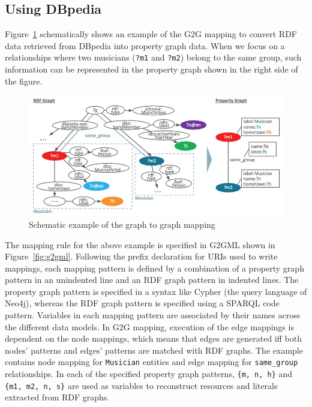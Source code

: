 \documentclass[runningheads]{llncs}
\begin{document}
 
\subsection{Using DBpedia}
 
Figure~\ref{fig:conversion} schematically shows an example of the G2G mapping to convert RDF data retrieved from DBpedia into property graph data. 
When we focus on a relationships where two musicians (\texttt{?m1} and \texttt{?m2}) belong to the same group, such information can be represented in the property graph shown in the right side of the figure.
 
\begin{figure}
\center
\includegraphics[width=1.0\textwidth]{example.jpg}
\caption{Schematic example of the graph to graph mapping}
\label{fig:conversion}
\end{figure}
 
The mapping rule for the above example is specified in G2GML shown in Figure~\ref{fig:g2gml}. Following the prefix declaration for URIs used to write mappings, each mapping pattern is defined by a combination of a property graph pattern in an unindented line and an RDF graph pattern in indented lines. The property graph pattern is specified in a syntax like Cypher (the query language of Neo4j), whereas the RDF graph pattern is specified using a SPARQL code pattern. 
Variables in each mapping pattern are associated by their names across the different data models. 
In G2G mapping, execution of the edge mappings is dependent on the node mappings, which means that edges are generated iff both nodes' patterns and edges' patterns are matched with RDF graphs. 
The example contains node mapping for \texttt{Musician} entities and edge mapping for \texttt{same\_group} relationships.
In each of the specified property graph patterns, \texttt{\{m, n, h\}} and \texttt{\{m1, m2, n, s\}} are used as variables to reconstruct resources and literals extracted from RDF graphs. 
 
\end{document}
